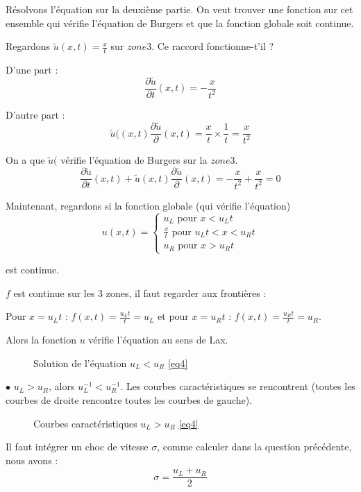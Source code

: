 \documentclass{article}
\begin{document}
Résolvons l'équation sur la deuxième partie. On veut trouver une fonction sur cet ensemble qui vérifie l'équation de Burgers et que la fonction globale soit continue.

Regardons $\tilde{u}(x,t) = \frac{x}{t}$ sur $zone3$. Ce raccord fonctionne-t'il ?

D'une part :
\[ \frac{\partial \tilde{u}}{\partial t}(x,t) = -\frac{x}{t^2} \]


D'autre part :
\[ \tilde{u}((x,t) \frac{\partial \tilde{u}}{\partial}(x,t) = \frac{x}{t} \times \frac{1}{t} = \frac{x}{t^2} \]

On a que $\tilde{u}($ vérifie l'équation de Burgers sur la $zone3$.
\[ \frac{\partial \tilde{u}}{\partial t}(x,t) + \tilde{u}(x,t) \frac{\partial \tilde{u}}{\partial}(x,t) = -\frac{x}{t^2} + \frac{x}{t^2} = 0 \]

Maintenant, regardons si la fonction globale  (qui vérifie l'équation)
\[
u(x,t) = \left\{ \begin{matrix}
			u_L \text{ pour } x < u_L t \\
			\frac{x}{t} \text{ pour } u_L t < x < u_R t \\
			u_R \text{ pour } x > u_R t
\end{matrix} \right.
\tag{Sol4.1}
\]

est continue.

$f$ est continue sur les 3 zones, il faut regarder aux frontières :

Pour $x = u_L t$ : $f(x,t) = \frac{u_L t}{t} = u_L$ et pour $x = u_R t$ : $f(x,t) = \frac{u_R t}{t} = u_R$.
\newline

Alors la fonction $u$ vérifie l'équation au sens de Lax.

\begin{figure}[h]
  
  \caption{Solution de l'équation $u_L < u_R$ \ref{eq4}}
\end{figure}


$\bullet$ $u_L > u_R$, alors $u_L^{-1} < u_R^{-1}$. Les courbes caractéristiques se rencontrent (toutes les courbes de droite rencontre toutes les courbes de gauche).

\begin{figure}[h]
  
  \caption{Courbes caractéristiques $u_L > u_R$ \ref{eq4}}
\end{figure}

Il faut intégrer un choc de vitesse $\sigma$, comme calculer dans la question précédente, nous avons :
\[ \sigma = \frac{u_L+u_R}{2} \]
\end{document}
